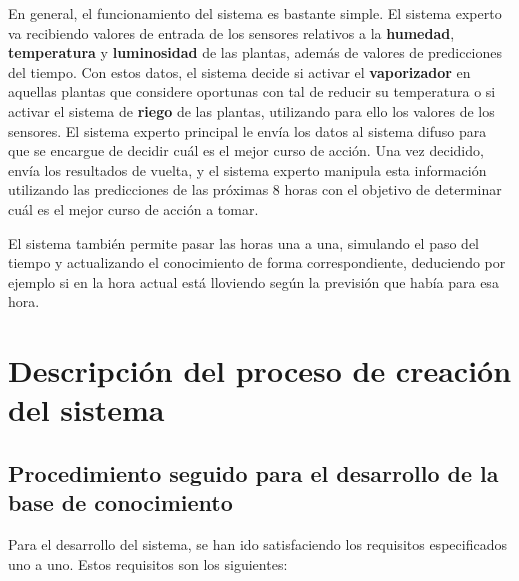 \documentclass[11pt,a4paper]{article}
\begin{document}
En general, el funcionamiento del sistema es bastante simple. El sistema experto va recibiendo valores de entrada de los sensores
relativos a la \textbf{humedad}, \textbf{temperatura} y \textbf{luminosidad} de las plantas, además de valores de predicciones del
tiempo.
Con estos datos, el sistema decide si activar el \textbf{vaporizador} en aquellas plantas que considere oportunas con tal de
reducir su temperatura o si activar el sistema de \textbf{riego} de las plantas, utilizando para ello los valores de los sensores.
El sistema experto principal le envía los datos al sistema difuso para que se encargue de decidir cuál es el mejor curso de acción.
Una vez decidido, envía los resultados de vuelta, y el sistema experto manipula esta información utilizando las predicciones de las
próximas 8 horas con el objetivo de determinar cuál es el mejor curso de acción a tomar.

El sistema también permite pasar las horas una a una, simulando el paso del tiempo y actualizando el conocimiento de forma
correspondiente, deduciendo por ejemplo si en la hora actual está lloviendo según la previsión que había para esa hora.

\newpage

\section{Descripción del proceso de creación del sistema}

\subsection{Procedimiento seguido para el desarrollo de la base de conocimiento}

Para el desarrollo del sistema, se han ido satisfaciendo los requisitos especificados uno a uno. Estos requisitos son los
siguientes:
\end{document}
